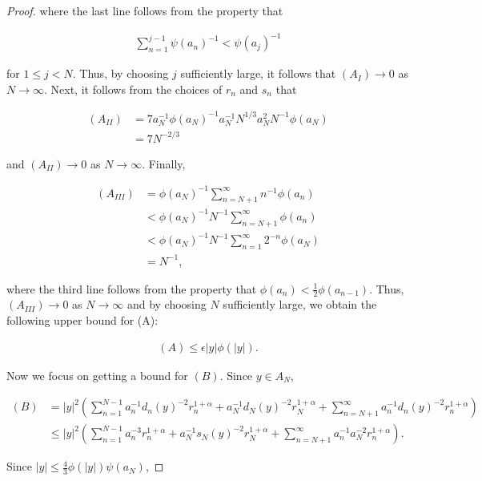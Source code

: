 \documentclass{article}
\theoremstyle{definition}
\begin{document}
\begin{proof}
\noindent where the last line follows from the property that

\begin{align*}
    \sum_{n=1}^{j-1} \psi(a_n)^{-1} < \psi(a_j)^{-1}
\end{align*}


\noindent for $1\leq j < N$. Thus, by choosing $j$ sufficiently large, it follows that $(A_I) \to 0$ as $N \to \infty$. Next, it follows from the choices of $r_n$ and $s_n$ that

\begin{align*}
    (A_{II}) &= 7 a_N^{-1} \phi(a_N)^{-1} a_N^{-1} N^{1/3} a_N^2 N^{-1} \phi(a_N)\\
    &= 7 N^{-2/3}
\end{align*}


\noindent and $(A_{II}) \to 0$ as $N \to \infty$. Finally, 

\begin{align*}
    (A_{III}) &= \phi(a_N)^{-1} \sum_{n=N+1}^{\infty} n^{-1} \phi(a_n)\\
 &< \phi(a_N)^{-1} N^{-1} \sum_{n=N+1}^{\infty}  \phi(a_n) \\
    &< \phi(a_N)^{-1} N^{-1} \sum_{n=1}^{\infty} 2^{-n} \phi(a_N)\\
    & = N^{-1},
\end{align*}


\noindent  where the third line follows from the property that $\phi(a_n) < \frac{1}{2} \phi(a_{n-1})$. Thus, $(A_{III}) \to 0$ as $N \to \infty$ and by choosing $N$ sufficiently large, we obtain the following upper bound for (A):

\begin{align*}
    (A) \leq \epsilon |y| \phi(|y|).
\end{align*}


 Now we focus on getting a bound for $(B)$. Since $y \in A_N$,

\begin{align*}
    (B) &= |y|^2 \left( \sum_{n=1}^{N-1}  a_n^{-1} d_n(y)^{-2}  r_n^{1+\alpha} + a_N^{-1} d_N(y)^{-2} r_N^{1+\alpha} + \sum_{n=N+1}^{\infty}  a_n^{-1} d_n(y)^{-2}  r_n^{1+\alpha}\right)\\
    &\leq |y|^2\left( \sum_{n=1}^{N-1}  a_n^{-3}  r_n^{1+\alpha} + a_N^{-1} s_N(y)^{-2} r_N^{1+\alpha} + \sum_{n=N+1}^{\infty}  a_n^{-1} a_N^{-2}  r_n^{1+\alpha} \right).
\end{align*}


\noindent Since $|y| \leq \frac{4}{3} \phi(|y|) \psi(a_N)$,


\end{proof}
\end{document}

